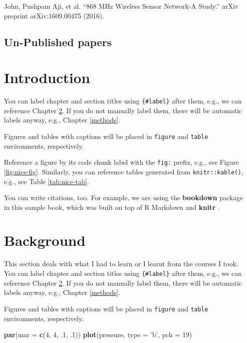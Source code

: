 \documentclass[]{book}
\newenvironment{Shaded}{\begin{snugshade}}{\end{snugshade}}
\newcommand{\KeywordTok}[1]{\textcolor[rgb]{0.13,0.29,0.53}{\textbf{#1}}}
\newcommand{\DataTypeTok}[1]{\textcolor[rgb]{0.13,0.29,0.53}{#1}}
\newcommand{\DecValTok}[1]{\textcolor[rgb]{0.00,0.00,0.81}{#1}}
\newcommand{\StringTok}[1]{\textcolor[rgb]{0.31,0.60,0.02}{#1}}
\newcommand{\NormalTok}[1]{#1}
\theoremstyle{definition}
\theoremstyle{definition}
\theoremstyle{definition}
\theoremstyle{remark}
\begin{document}
John, Pushpam Aji, et al. ``868 MHz Wireless Sensor Network-A Study.''
arXiv preprint arXiv:1609.00475 (2016).

\section{Un-Published papers}\label{un-published-papers}

\chapter{Introduction}\label{intro}

You can label chapter and section titles using \texttt{\{\#label\}}
after them, e.g., we can reference Chapter \ref{intro}. If you do not
manually label them, there will be automatic labels anyway, e.g.,
Chapter \ref{methods}.

Figures and tables with captions will be placed in \texttt{figure} and
\texttt{table} environments, respectively.

Reference a figure by its code chunk label with the \texttt{fig:}
prefix, e.g., see Figure \ref{fig:nice-fig}. Similarly, you can
reference tables generated from \texttt{knitr::kable()}, e.g., see Table
\ref{tab:nice-tab}.

You can write citations, too. For example, we are using the
\textbf{bookdown} package \citep{R-bookdown} in this sample book, which
was built on top of R Markdown and \textbf{knitr} \citep{aj2018}.

\chapter{Background}\label{background}

This section deals with what I had to learn or I learnt from the courses
I took. You can label chapter and section titles using
\texttt{\{\#label\}} after them, e.g., we can reference Chapter
\ref{intro}. If you do not manually label them, there will be automatic
labels anyway, e.g., Chapter \ref{methods}.

Figures and tables with captions will be placed in \texttt{figure} and
\texttt{table} environments, respectively.

\begin{Shaded}
\begin{Highlighting}[]
\KeywordTok{par}\NormalTok{(}\DataTypeTok{mar =} \KeywordTok{c}\NormalTok{(}\DecValTok{4}\NormalTok{, }\DecValTok{4}\NormalTok{, .}\DecValTok{1}\NormalTok{, .}\DecValTok{1}\NormalTok{))}
\KeywordTok{plot}\NormalTok{(pressure, }\DataTypeTok{type =} \StringTok{'b'}\NormalTok{, }\DataTypeTok{pch =} \DecValTok{19}\NormalTok{)}
\end{Highlighting}
\end{Shaded}
\end{document}
